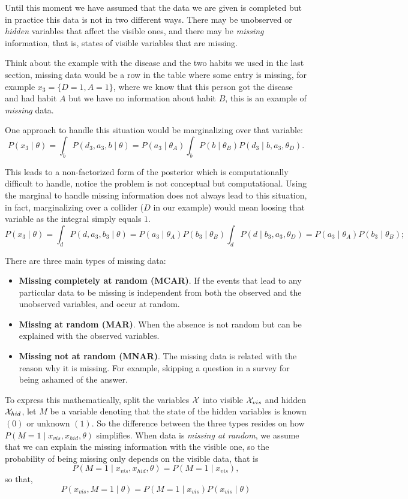 
Until this moment we have assumed that the data we are given is completed but in practice this data is not in two different ways. There may be unobserved or \emph{hidden} variables that affect the visible ones, and there may be \emph{missing} information, that is, states of visible variables that are missing.

Think about the example with the disease and the two habits we used in the last section, missing data would be a row in the table where some entry is missing, for example \(x_{3} = \{D = 1, A = 1\}\), where we know that this person got the disease and had habit \(A\) but we have no information about habit \(B\), this is an example of \emph{missing} data.

One approach to handle this situation would be marginalizing over that variable:
\[
  P(x_{3} \mid \theta) = \int_{b}P(d_{3}, a_{3}, b \mid \theta) = P(a_{3} \mid \theta_{A})\int_{b}P(b \mid \theta_{B})P(d_{3} \mid b, a_{3}, \theta_{D}).
\]

This leads to a non-factorized form of the posterior which is computationally difficult to handle, notice the problem is not conceptual but computational. Using the marginal to handle missing information does not always lead to this situation, in fact, marginalizing over a collider (\(D\) in our example) would mean loosing that variable as the integral simply equals \(1\).
\[
  P(x_{3} \mid \theta) = \int_{d}P(d, a_{3}, b_{3} \mid \theta) = P(a_{3} \mid \theta_{A})P(b_{3}\mid \theta_{B})\int_{d}P(d \mid b_{3}, a_{3}, \theta_{D}) = P(a_{3} \mid \theta_{A}) P(b_{3} \mid \theta_{B});
\]

There are three main types of missing data:
\begin{itemize}
  \item \textbf{Missing completely at random (MCAR)}. If the events that lead to any particular data to be missing is independent from both the observed and the unobserved variables, and occur at random.
  \item \textbf{Missing at random (MAR)}. When the absence is not random but can be explained with the observed variables.
  \item \textbf{Missing not at random (MNAR)}. The missing data is related with the reason why it is missing. For example, skipping a question in a survey for being ashamed of the answer.
\end{itemize}

To express this mathematically, split the variables \(\mathcal{X}\) into visible \(\mathcal{X}_{vis}\) and hidden \(\mathcal{X}_{hid}\), let \(M\) be a variable denoting that the state of the hidden variables is known \((0)\) or unknown \((1)\).
So the difference between the three types resides on how \(P(M = 1 \mid x_{vis}, x_{hid}, \theta)\) simplifies. When data is \emph{missing at random}, we assume that we can explain the missing information with the visible one, so the probability of being missing only depends on the visible data, that is
\[
  P(M = 1 \mid x_{vis}, x_{hid}, \theta) = P(M = 1 \mid x_{vis}),
\]
so that,
\[
  P(x_{vis}, M = 1 \mid \theta) = P(M = 1 \mid x_{vis})P(x_{vis} \mid \theta)
\]

